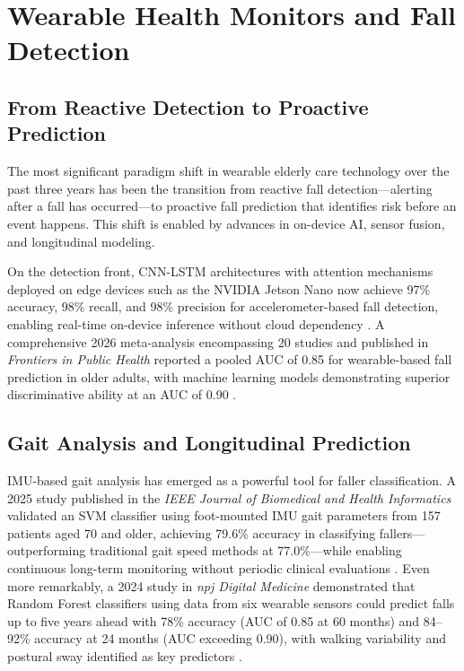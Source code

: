 \documentclass[conference]{IEEEtran}
\begin{document}
\section{Wearable Health Monitors and Fall Detection}

\subsection{From Reactive Detection to Proactive Prediction}

The most significant paradigm shift in wearable elderly care technology over the past three years has been the transition from reactive fall detection---alerting after a fall has occurred---to proactive fall prediction that identifies risk before an event happens. This shift is enabled by advances in on-device AI, sensor fusion, and longitudinal modeling.

On the detection front, CNN-LSTM architectures with attention mechanisms deployed on edge devices such as the NVIDIA Jetson Nano now achieve 97\% accuracy, 98\% recall, and 98\% precision for accelerometer-based fall detection, enabling real-time on-device inference without cloud dependency \cite{pmc_fall_edge}. A comprehensive 2026 meta-analysis encompassing 20 studies and published in \textit{Frontiers in Public Health} reported a pooled AUC of 0.85 for wearable-based fall prediction in older adults, with machine learning models demonstrating superior discriminative ability at an AUC of 0.90 \cite{frontiers_meta}.

\subsection{Gait Analysis and Longitudinal Prediction}

IMU-based gait analysis has emerged as a powerful tool for faller classification. A 2025 study published in the \textit{IEEE Journal of Biomedical and Health Informatics} validated an SVM classifier using foot-mounted IMU gait parameters from 157 patients aged 70 and older, achieving 79.6\% accuracy in classifying fallers---outperforming traditional gait speed methods at 77.0\%---while enabling continuous long-term monitoring without periodic clinical evaluations \cite{ieee_imu}. Even more remarkably, a 2024 study in \textit{npj Digital Medicine} demonstrated that Random Forest classifiers using data from six wearable sensors could predict falls up to five years ahead with 78\% accuracy (AUC of 0.85 at 60 months) and 84--92\% accuracy at 24 months (AUC exceeding 0.90), with walking variability and postural sway identified as key predictors \cite{npj_fall}.
\end{document}
